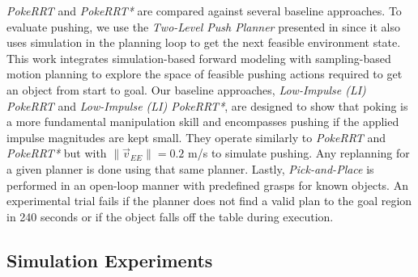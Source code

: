 \textsl{PokeRRT} and \textsl{PokeRRT*} are compared against several baseline approaches. To evaluate pushing, we use the \textsl{Two-Level Push Planner} presented in \cite{zito2012two} since it also uses simulation in the planning loop to get the next feasible environment state. This work integrates simulation-based forward modeling with sampling-based motion planning to explore the space of feasible pushing actions required to get an object from start to goal. Our baseline approaches, \textsl{Low-Impulse (LI) PokeRRT} and \textsl{Low-Impulse (LI) PokeRRT*}, are designed to show that poking is a more fundamental manipulation skill and encompasses pushing if the applied impulse magnitudes are kept small. They operate similarly to \textsl{PokeRRT} and \textsl{PokeRRT*} but with $\|\vec{v}_{EE}\| = 0.2$ m/s to simulate pushing. Any replanning for a given planner is done using that same planner. Lastly, \textsl{Pick-and-Place} is performed in an open-loop manner with predefined grasps for known objects. An experimental trial fails if the planner does not find a valid plan to the goal region in 240 seconds or if the object falls off the table during execution.

\subsection{Simulation Experiments}

